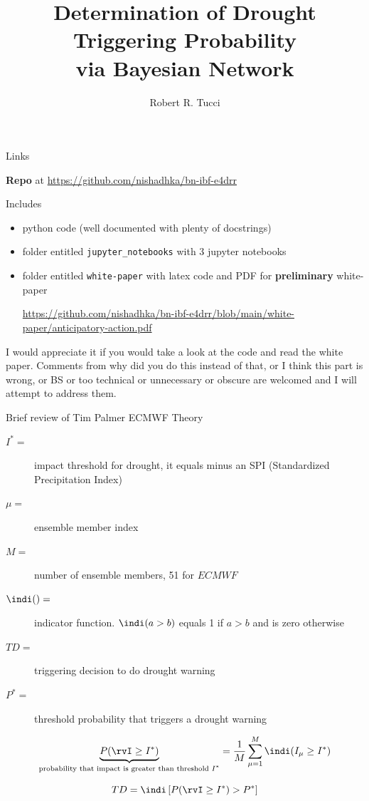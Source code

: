 \documentclass{beamer}
\title{Determination of Drought Triggering Probability \\via Bayesian Network}
\author{Robert R. Tucci}
\institute{ICPAC, www.ar-tiste.xyz}
\begin{document}
\begin{frame}
\titlepage
\end{frame}

\begin{frame}{Links}


{\bf Repo} at
{\tiny \url{https://github.com/nishadhka/bn-ibf-e4drr} }

Includes
\begin{itemize}
\item python code (well documented with plenty of docstrings)
\item folder entitled {\tt jupyter\_notebooks} with 3 jupyter notebooks
\item folder entitled {\tt white-paper} with latex code and PDF for {\bf preliminary} white-paper 

{\tiny \url{https://github.com/nishadhka/bn-ibf-e4drr/blob/main/white-paper/anticipatory-action.pdf}}
\end{itemize}

I would appreciate it if you would take a look at the code and read the white paper. Comments from {\color{red} why did you do this instead of that}, or {\color{red} I think this part is wrong, or BS or too technical or unnecessary or obscure} are welcomed and I will attempt to address them.
\end{frame}

\begin{frame}{Brief review of Tim Palmer ECMWF Theory}

\begin{description}
\item[$I^*  =$] impact threshold 
   for drought, it equals minus an SPI (Standardized Precipitation Index)
   
\item[$\mu=$] ensemble member index

\item[$M=$] number of ensemble members, 51 for $ECMWF$

\item[$\indi()=$] indicator function. $\indi(a>b)$
equals 1 if $a>b$ and is zero otherwise

\item[$TD=$] triggering decision to do drought warning
\item[$P^*=$] threshold probability that triggers a  drought warning

\end{description}

$$
\underbrace{P(\rvI\geq I^*  )}_{
\text{probability that impact is greater than threshold $I^*$}}= \frac{1}{M} \sum_{\mu=1}^{M} \indi(I_{\mu} \geq I^*) 
$$



$$
TD=
\indi\left[P(\rvI\geq I^*  ) > P^*\right]
$$
\end{frame}
\end{document}
